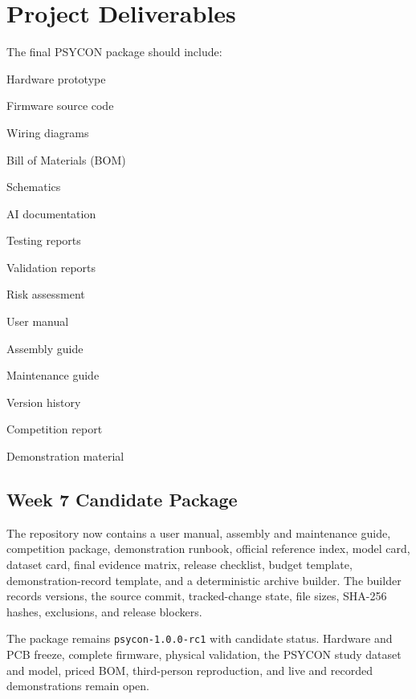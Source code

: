 \section{Project Deliverables}
\label{sec:project-deliverables}

The final PSYCON package should include:
\begin{checklist}
    \item Hardware prototype
    \item Firmware source code
    \item Wiring diagrams
    \item Bill of Materials (BOM)
    \item Schematics
    \item AI documentation
    \item Testing reports
    \item Validation reports
    \item Risk assessment
    \item User manual
    \item Assembly guide
    \item Maintenance guide
    \item Version history
    \item Competition report
    \item Demonstration material
\end{checklist}

\subsection{Week 7 Candidate Package}

The repository now contains a user manual, assembly and maintenance guide, competition package, demonstration runbook, official reference index, model card, dataset card, final evidence matrix, release checklist, budget template, demonstration-record template, and a deterministic archive builder. The builder records versions, the source commit, tracked-change state, file sizes, SHA-256 hashes, exclusions, and release blockers.

The package remains \texttt{psycon-1.0.0-rc1} with candidate status. Hardware and PCB freeze, complete firmware, physical validation, the PSYCON study dataset and model, priced BOM, third-person reproduction, and live and recorded demonstrations remain open.

